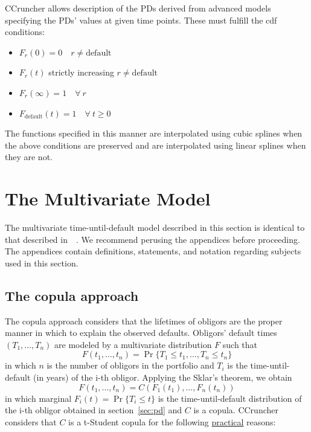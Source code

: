\documentclass[11pt,fleqn]{book} %
\begin{document}
CCruncher allows description of the PDs derived from advanced models specifying 
the PDs' values at given time points. These must fulfill the cdf conditions:
\begin{itemize}
	\item $F_r(0) = 0 \quad r \ne \text{default}$
	\item $F_r(t)$ strictly increasing $r \ne \text{default}$
	\item $F_r(\infty) = 1 \quad \forall\ r$
	\item $F_{\text{default}}(t) = 1 \quad \forall\ t \ge 0$
\end{itemize}
The functions specified in this manner are interpolated using cubic splines
when the above conditions are preserved and are interpolated using linear 
splines when they are not.

\section{The Multivariate Model}

The multivariate time-until-default model described in this section is identical
to that described in~\cite{li:2000,roncalli:2001,frey:2001}~\cite[chap. 2.6]{bluhm:2002}.
We recommend perusing the appendices before proceeding. The appendices contain 
definitions, statements, and notation regarding subjects used in this section.

\subsection{The copula approach}
The copula approach considers that the lifetimes of obligors are the proper 
manner in which to explain the observed defaults. Obligors' default times 
$(T_1,\dots,T_n)$ are modeled by a multivariate distribution $F$ such that
\begin{displaymath}
	F(t_1, \dots, t_n) = \Pr \{T_1 \le t_1, \dots, T_n \le t_n\}
\end{displaymath}
in which $n$ is the number of obligors in the portfolio and $T_i$ is the 
time-until-default (in years) of the i-th obligor. Applying the Sklar's 
theorem, we obtain
\begin{displaymath}
	F(t_1, \dots, t_n) = 
	C\left(F_1(t_1), \dots, F_n(t_n)\right)
\end{displaymath}
in which marginal $F_i(t) = \Pr\{T_i \le t\}$ is the time-until-default 
distribution of the i-th obligor obtained in section~\ref{sec:pd} and $C$ 
is a copula. CCruncher considers that $C$ is a t-Student copula for the 
following \ul{practical} reasons:
\end{document}
